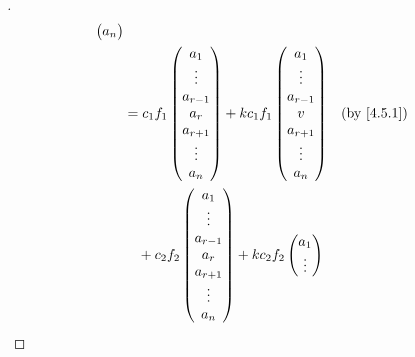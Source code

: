 \begin{proof}[]
\begin{align*}
\begin{pmatrix}
                                                                          a_n
                                                                        \end{pmatrix}                 \\
     & = c_1 f_1\begin{pmatrix}
                  a_1       \\
                  \vdots    \\
                  a_{r - 1} \\
                  a_r       \\
                  a_{r + 1} \\
                  \vdots    \\
                  a_n
                \end{pmatrix} + k c_1 f_1\begin{pmatrix}
                                           a_1       \\
                                           \vdots    \\
                                           a_{r - 1} \\
                                           v         \\
                                           a_{r + 1} \\
                                           \vdots    \\
                                           a_n
                                         \end{pmatrix}             &  & \text{(by \cref{4.5.1})}       \\
     & \quad + c_2 f_2\begin{pmatrix}
                        a_1       \\
                        \vdots    \\
                        a_{r - 1} \\
                        a_r       \\
                        a_{r + 1} \\
                        \vdots    \\
                        a_n
                      \end{pmatrix} + k c_2 f_2\begin{pmatrix}
                                                 a_1       \\
                                                 \vdots    \\

\end{pmatrix}
\end{align*}
\end{proof}

